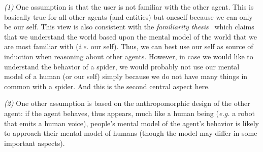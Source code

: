 \documentclass{frontiersSCNS} %
\newcommand{\eg}{\textit{e.g.}\xspace}
\newcommand{\ie}{\textit{i.e.}\xspace}
\begin{document}
\textit{(1)} One assumption is that the user is not familiar with the other
agent. This is basically true for all other agents (and entities) but oneself
because we can only be our self. This view is also consistent with the
\emph{familiarity thesis}~\citep{hegel_understanding_2008} which claims that we
understand the world based upon the mental model of the world that we are most
familiar with (\ie our self). Thus, we can best use our self as source of induction
when reasoning about other agents. However, in case we would like to understand
the behavior of a spider, we would probably not use our mental model of a human
(or our self) simply because we do not have many things in common with a spider.
And this is the second central aspect here.

\textit{(2)} One other assumption is based on the anthropomorphic design of the
other agent: if the agent behaves, thus appears, much like a human being (\eg a
robot that emits a human voice), people's mental model of the agent's behavior
is likely to approach their mental model of humans (though the model may differ
in some important aspects).
\end{document}

